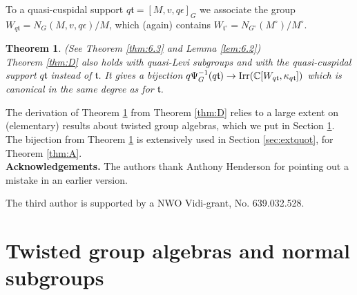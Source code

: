 \documentclass[11pt]{amsart}
\newtheorem{thmintro}{Theorem}
\theoremstyle{definition}
\newcommand{\C}{\mathbb C}
\def\Irr{{\rm Irr}}
\def\ft{{\mathfrak t}}
\begin{document}
To a quasi-cuspidal support $q \ft = [M,v,q \epsilon]_G$ we associate the group
$W_{q \ft} = N_G (M,v,q\epsilon) / M$, which (again) contains
$W_{\ft^\circ} = N_{G^\circ}(M^\circ) / M^\circ$.

\begin{thmintro}\label{thm:E} (See Theorem \ref{thm:6.3} and Lemma \ref{lem:6.2}) \\
Theorem \ref{thm:D} also holds with quasi-Levi subgroups and with the quasi-cuspidal
support $q \ft$ instead of $\ft$. It gives a bijection
$q \Psi_G^{-1}(q \ft) \to \Irr (\C [W_{q \ft},\kappa_{q \ft}])$ 
which is canonical in the same degree as for $\ft$.
\end{thmintro}

The derivation of Theorem \ref{thm:E} from Theorem \ref{thm:D} relies to a large
extent on (elementary) results about twisted group algebras, which we put in
Section \ref{sec:twisted}. The bijection from Theorem \ref{thm:E} is extensively
used in Section \ref{sec:extquot}, for Theorem \ref{thm:A}.\\

\noindent \textbf{Acknowledgements.}
The authors thank Anthony Henderson for pointing out a mistake in an earlier version.

The third author is supported by a NWO Vidi-grant, No. 639.032.528.

\section{Twisted group algebras and normal subgroups}
\label{sec:twisted}
\end{document}
